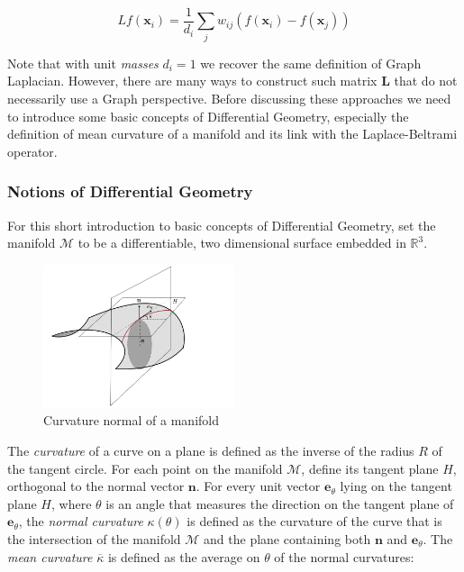 \begin{equation}\label{eq:discrete laplacian}
	L f\left(\mathbf{x}_{i}\right)=\frac{1}{d_{i}} \sum_{j} w_{i j}\left(f\left(\mathbf{x}_{i}\right)-f\left(\mathbf{x}_{j}\right)\right)
\end{equation}

Note that with unit \textit{masses} $d_i=1$ we recover the same definition of Graph Laplacian. However, there are many ways to construct such matrix $\mathbf L$ that do not necessarily use a Graph perspective. Before discussing these approaches we need to introduce some basic concepts of Differential Geometry, especially the definition of mean curvature of a manifold and its link with the Laplace-Beltrami operator.

\subsubsection{Notions of Differential Geometry}

 For this short introduction to basic concepts of Differential Geometry, set the manifold $\mathcal M$ to be a differentiable, two dimensional surface embedded in $\mathbb R^3$. 
 \begin{figure}[h]
 	\centering
 	\includegraphics[width=0.5\textwidth]{figs/Chapter3/curvature.png}
 	\caption{\label{fig:curvature}Curvature normal of a manifold}
 \end{figure} 
The \textit{curvature} of a curve on a plane is defined as the inverse of the radius $R$ of the tangent circle. For each point on the manifold $\mathcal M$, define its tangent plane $H$, orthogonal to the normal vector $\mathbf n$. For every unit vector $\mathbf e_\theta$ lying on the tangent plane $H$, where $\theta$ is an angle that measures the direction on the tangent plane of $\mathbf e_\theta$, the \textit{normal curvature} $\kappa(\theta)$ is defined as the curvature of the curve that is the intersection of the manifold $\mathcal M$ and the plane containing both $\mathbf n$ and $\mathbf e_\theta$. The \textit{mean curvature} $\overline \kappa $ is defined as the average on $\theta$ of the normal curvatures:
 
